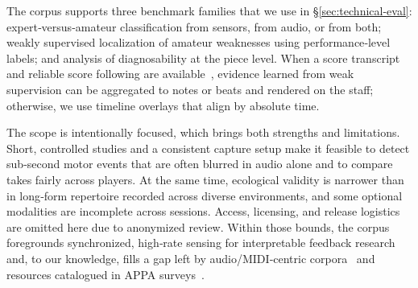 \documentclass[sigconf,review,anonymous]{acmart}
\begin{document}
The corpus supports three benchmark families that we use in §\ref{sec:technical-eval}: expert‑versus‑amateur classification from sensors, from audio, or from both; weakly supervised localization of amateur weaknesses using performance‑level labels; and analysis of diagnosability at the piece level. When a score transcript and reliable score following are available~\cite{nakamura2016}, evidence learned from weak supervision can be aggregated to notes or beats and rendered on the staff; otherwise, we use timeline overlays that align by absolute time.

The scope is intentionally focused, which brings both strengths and limitations. Short, controlled studies and a consistent capture setup make it feasible to detect sub‑second motor events that are often blurred in audio alone and to compare takes fairly across players. At the same time, ecological validity is narrower than in long‑form repertoire recorded across diverse environments, and some optional modalities are incomplete across sessions. Access, licensing, and release logistics are omitted here due to anonymized review. Within those bounds, the corpus foregrounds synchronized, high‑rate sensing for interpretable feedback research and, to our knowledge, fills a gap left by audio/MIDI‑centric corpora~\cite{Hawthorne2019MAESTRO,Emiya2010MAPS,Foscarin2020ASAP} and resources catalogued in APPA surveys~\cite{Kim2022APPA}.
\end{document}
